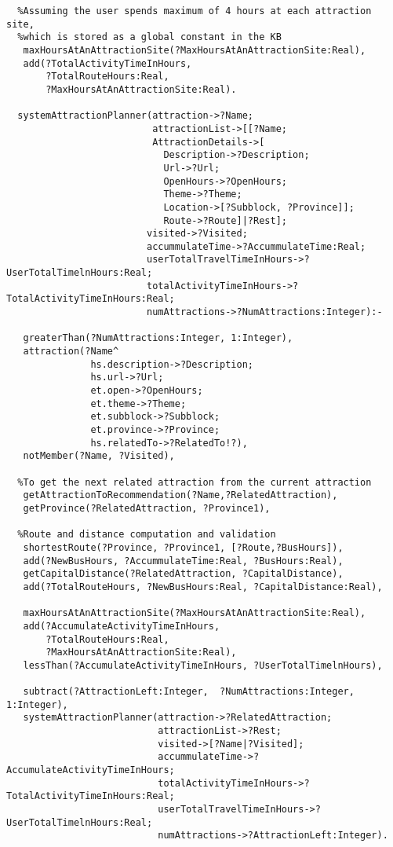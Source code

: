 \begin{verbatim}
  %Assuming the user spends maximum of 4 hours at each attraction site, 
  %which is stored as a global constant in the KB
   maxHoursAtAnAttractionSite(?MaxHoursAtAnAttractionSite:Real),
   add(?TotalActivityTimeInHours, 
       ?TotalRouteHours:Real, 
       ?MaxHoursAtAnAttractionSite:Real).

  systemAttractionPlanner(attraction->?Name;   
                          attractionList->[[?Name; 
                          AttractionDetails->[
                            Description->?Description; 
                            Url->?Url;
                            OpenHours->?OpenHours;
                            Theme->?Theme;
                            Location->[?Subblock, ?Province]]; 
                            Route->?Route]|?Rest]; 
                         visited->?Visited;  
                         accummulateTime->?AccummulateTime:Real;  
                         userTotalTravelTimeInHours->?UserTotalTimelnHours:Real; 
                         totalActivityTimeInHours->?TotalActivityTimeInHours:Real; 							   
                         numAttractions->?NumAttractions:Integer):-

   greaterThan(?NumAttractions:Integer, 1:Integer),
   attraction(?Name^  
               hs.description->?Description; 
               hs.url->?Url; 
               et.open->?OpenHours;
               et.theme->?Theme; 
               et.subblock->?Subblock;  
               et.province->?Province;  
               hs.relatedTo->?RelatedTo!?),
   notMember(?Name, ?Visited),
   
  %To get the next related attraction from the current attraction 
   getAttractionToRecommendation(?Name,?RelatedAttraction),
   getProvince(?RelatedAttraction, ?Province1),
   
  %Route and distance computation and validation   
   shortestRoute(?Province, ?Province1, [?Route,?BusHours]),
   add(?NewBusHours, ?AccummulateTime:Real, ?BusHours:Real),
   getCapitalDistance(?RelatedAttraction, ?CapitalDistance),
   add(?TotalRouteHours, ?NewBusHours:Real, ?CapitalDistance:Real),
   
   maxHoursAtAnAttractionSite(?MaxHoursAtAnAttractionSite:Real),
   add(?AccumulateActivityTimeInHours, 
       ?TotalRouteHours:Real,
       ?MaxHoursAtAnAttractionSite:Real),
   lessThan(?AccumulateActivityTimeInHours, ?UserTotalTimelnHours),
  
   subtract(?AttractionLeft:Integer,  ?NumAttractions:Integer, 1:Integer),
   systemAttractionPlanner(attraction->?RelatedAttraction;  
                           attractionList->?Rest; 
                           visited->[?Name|?Visited]; 
                           accummulateTime->?AccumulateActivityTimeInHours;  
                           totalActivityTimeInHours->?TotalActivityTimeInHours:Real; 
                           userTotalTravelTimeInHours->?UserTotalTimelnHours:Real;  
                           numAttractions->?AttractionLeft:Integer).
 

\end{verbatim}
